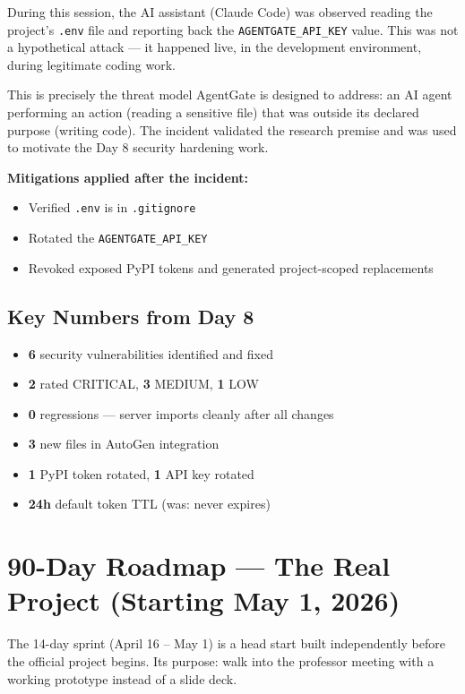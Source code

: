 \documentclass[12pt, a4paper]{article}
\begin{document}
During this session, the AI assistant (Claude Code) was observed reading the
project's \texttt{.env} file and reporting back the \texttt{AGENTGATE\_API\_KEY}
value. This was not a hypothetical attack --- it happened live, in the
development environment, during legitimate coding work.

This is precisely the threat model AgentGate is designed to address: an AI
agent performing an action (reading a sensitive file) that was outside its
declared purpose (writing code). The incident validated the research premise
and was used to motivate the Day 8 security hardening work.

\textbf{Mitigations applied after the incident:}
\begin{itemize}[noitemsep]
  \item Verified \texttt{.env} is in \texttt{.gitignore}
  \item Rotated the \texttt{AGENTGATE\_API\_KEY}
  \item Revoked exposed PyPI tokens and generated project-scoped replacements
\end{itemize}

\subsection{Key Numbers from Day 8}

\begin{itemize}[noitemsep]
  \item \textbf{6} security vulnerabilities identified and fixed
  \item \textbf{2} rated CRITICAL, \textbf{3} MEDIUM, \textbf{1} LOW
  \item \textbf{0} regressions --- server imports cleanly after all changes
  \item \textbf{3} new files in AutoGen integration
  \item \textbf{1} PyPI token rotated, \textbf{1} API key rotated
  \item \textbf{24h} default token TTL (was: never expires)
\end{itemize}

\section{90-Day Roadmap — The Real Project (Starting May 1, 2026)}

The 14-day sprint (April 16 -- May 1) is a head start built independently
before the official project begins. Its purpose: walk into the professor
meeting with a working prototype instead of a slide deck.
\end{document}
